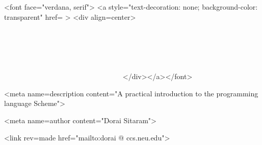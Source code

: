 \htmlonly
{}
\rawhtml
<font face="verdana, serif">
<a style="text-decoration: none; background-color: transparent"
href=\endrawhtml 
{}
\rawhtml>
<div align=center>
\endrawhtml
{\bf\obeylines
~~~~~~~~~
~~~~~~~~~
~~~~~~~~~
~~~~~~~~~
~~~~~~~~~
~~~~~~~~~~~~
~~~~~~~~~~~~~~~~~~~~~~~~~~~
~~~
~~~
~~~~~~~~~~~~~~~~~~~
~~~~~~~~~~~~~~~~~~~~~~
~~~~~~~~~
~~~~~~~~~
~~~~~~~~~
~~~~~~~~~
~~~~~~~~~~~~
~~~~~~~~~~~~~~~~~~~~~~~~~~~~~~~~~~~~~~~~~
~~~~~~~~~
~~~~~~~~~
~~~~~~~~~
~~~~~~~~~
~~~~~~~~~
~~~~~~~~~
~~~~~~~~~
~~~~~~~~~
~~~~~~~~~
~~~~~~~~~
~~~~~~~~~
}
\rawhtml
</div></a></font>
\endrawhtml
\endhtmlonly

\htmlheadonly
<meta name=description content="A practical
introduction to the programming language Scheme">

<meta name=author content="Dorai Sitaram">

<link rev=made href="mailto:dorai @ ccs.neu.edu">
\endhtmlheadonly

\eject
